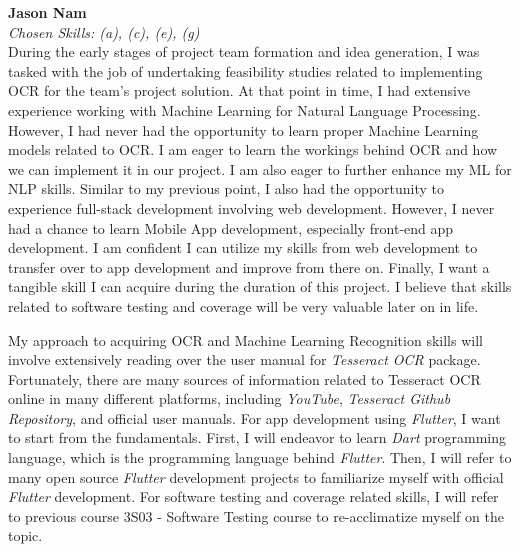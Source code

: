 \documentclass[12pt]{article}
\begin{document}
\begin{enumerate}
  \medskip
  \textbf{Jason Nam}\\
  \textit{Chosen Skills: (a), (c), (e), (g)}\\
  During the early stages of project team formation and idea generation, I was tasked with the job of undertaking feasibility studies related to implementing OCR for the team's project solution. At that point in time, I had extensive experience working with Machine Learning for Natural Language Processing. However, I had never had the opportunity to learn proper Machine Learning models related to OCR. I am eager to learn the workings behind OCR and how we can implement it in our project. I am also eager to further enhance my ML for NLP skills.
  Similar to my previous point, I also had the opportunity to experience full-stack development involving web development. However, I never had a chance to learn Mobile App development, especially front-end app development. I am confident I can utilize my skills from web development to transfer over to app development and improve from there on.
  Finally, I want a tangible skill I can acquire during the duration of this project. I believe that skills related to software testing and coverage will be very valuable later on in life. \par
  My approach to acquiring OCR and Machine Learning Recognition skills will involve extensively reading over the user manual for \textit{Tesseract OCR} package. Fortunately, there are many sources of information related to Tesseract OCR online in many different platforms, including \textit{YouTube}, \textit{Tesseract Github Repository}, and official user manuals. For app development using \textit{Flutter}, I want to start from the fundamentals. First, I will endeavor to learn \textit{Dart} programming language, which is the programming language behind \textit{Flutter}. Then, I will refer to many open source \textit{Flutter} development projects to familiarize myself with official \textit{Flutter} development. For software testing and coverage related skills, I will refer to previous course 3S03 - Software Testing course to re-acclimatize myself on the topic.


\end{enumerate}
\end{document}
